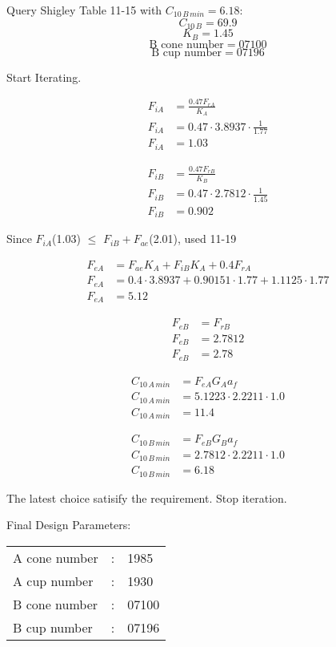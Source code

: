 Query Shigley Table 11-15 with $C_{10\,B\,min} = 6.18 $: 
$$C_{10\,B} = 69.9 $$
$$K_{B} = 1.45 $$
$$\text{B cone number} = 07100 $$
$$\text{B cup number} = 07196 $$

Start Iterating.

\begin{align*}
    F_{iA} &= \frac{0.47 F_{rA}}{K_{A}}\\
    F_{iA} &= 0.47 \cdot 3.8937 \cdot \frac{1}{1.77}\\
    F_{iA} &= 1.03
\end{align*}

\begin{align*}
    F_{iB} &= \frac{0.47 F_{rB}}{K_{B}}\\
    F_{iB} &= 0.47 \cdot 2.7812 \cdot \frac{1}{1.45}\\
    F_{iB} &= 0.902
\end{align*}

Since $F_{iA}$(1.03) $\leq$ $F_{iB} + F_{ae}$(2.01), used 11-19

\begin{align*}
    F_{eA} &= F_{ae} K_{A} + F_{iB} K_{A} + 0.4 F_{rA}\\
    F_{eA} &= 0.4 \cdot 3.8937 + 0.90151 \cdot 1.77 + 1.1125 \cdot 1.77\\
    F_{eA} &= 5.12
\end{align*}

\begin{align*}
    F_{eB} &= F_{rB}\\
    F_{eB} &= 2.7812\\
    F_{eB} &= 2.78
\end{align*}

\begin{align*}
    C_{10\,A\,min} &= F_{eA} G_{A} a_{f}\\
    C_{10\,A\,min} &= 5.1223 \cdot 2.2211 \cdot 1.0\\
    C_{10\,A\,min} &= 11.4
\end{align*}

\begin{align*}
    C_{10\,B\,min} &= F_{eB} G_{B} a_{f}\\
    C_{10\,B\,min} &= 2.7812 \cdot 2.2211 \cdot 1.0\\
    C_{10\,B\,min} &= 6.18
\end{align*}

The latest choice satisify the requirement. Stop iteration.

Final Design Parameters:\\
\begin{tabular}{lll}
    A cone number & : & 1985\\
    A cup number & : & 1930\\
    B cone number & : & 07100\\
    B cup number & : & 07196\\
\end{tabular}